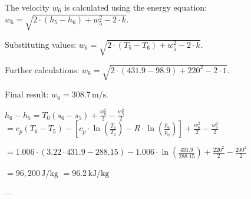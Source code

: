 The velocity \( w_6 \) is calculated using the energy equation:  
\( w_6 = \sqrt{2 \cdot \left( h_5 - h_6 \right) + w_5^2 - 2 \cdot k } \).  

Substituting values:  
\( w_6 = \sqrt{2 \cdot \left( T_5 - T_6 \right) + w_5^2 - 2 \cdot k } \).  

Further calculations:  
\( w_6 = \sqrt{2 \cdot \left( 431.9 - 98.9 \right) + 220^2 - 2 \cdot 1 } \).  

Final result:  
\( w_6 = 308.7 \, \text{m/s} \).

\( h_6 - h_5 = T_0 (s_6 - s_5) + \frac{w_6^2}{2} - \frac{w_5^2}{2} \)  
\( = c_p (T_6 - T_5) - \left[ c_p \cdot \ln \left( \frac{T_6}{T_0} \right) - R \cdot \ln \left( \frac{p_6}{p_0} \right) \right] + \frac{w_6^2}{2} - \frac{w_5^2}{2} \)  

\( = 1.006 \cdot \left( 3.22 \cdot 431.9 - 288.15 \right) - 1.006 \cdot \ln \left( \frac{431.9}{288.15} \right) + \frac{220^2}{2} - \frac{200^2}{2} \)  

\( = 96,200 \, \text{J/kg} \)  
\( = 96.2 \, \text{kJ/kg} \)  

---